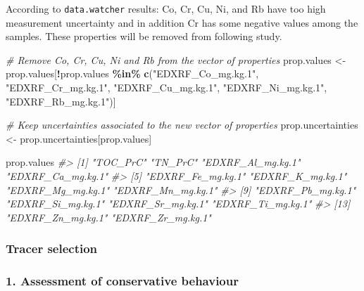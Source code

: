\documentclass[
]{article}
\newenvironment{Shaded}{\begin{snugshade}}{\end{snugshade}}
\newcommand{\CommentTok}[1]{\textcolor[rgb]{0.56,0.35,0.01}{\textit{#1}}}
\newcommand{\FunctionTok}[1]{\textcolor[rgb]{0.13,0.29,0.53}{\textbf{#1}}}
\newcommand{\NormalTok}[1]{#1}
\newcommand{\OtherTok}[1]{\textcolor[rgb]{0.56,0.35,0.01}{#1}}
\newcommand{\SpecialCharTok}[1]{\textcolor[rgb]{0.81,0.36,0.00}{\textbf{#1}}}
\newcommand{\StringTok}[1]{\textcolor[rgb]{0.31,0.60,0.02}{#1}}
\begin{document}
According to \texttt{data.watcher} results: Co, Cr, Cu, Ni, and Rb have
too high measurement uncertainty and in addition Cr has some negative
values among the samples. These properties will be removed from
following study.

\begin{Shaded}
\begin{Highlighting}[]
\CommentTok{\# Remove Co, Cr, Cu, Ni and Rb from the vector of properties}
\NormalTok{prop.values }\OtherTok{\textless{}{-}}\NormalTok{ prop.values[}\SpecialCharTok{!}\NormalTok{prop.values }\SpecialCharTok{\%in\%} \FunctionTok{c}\NormalTok{(}\StringTok{"EDXRF\_Co\_mg.kg.1"}\NormalTok{, }\StringTok{"EDXRF\_Cr\_mg.kg.1"}\NormalTok{, }\StringTok{"EDXRF\_Cu\_mg.kg.1"}\NormalTok{, }\StringTok{"EDXRF\_Ni\_mg.kg.1"}\NormalTok{, }\StringTok{"EDXRF\_Rb\_mg.kg.1"}\NormalTok{)]}

\CommentTok{\# Keep uncertainties associated to the new vector of properties}
\NormalTok{prop.uncertainties }\OtherTok{\textless{}{-}}\NormalTok{ prop.uncertainties[prop.values]}
\end{Highlighting}
\end{Shaded}

\begin{Shaded}
\begin{Highlighting}[]
\NormalTok{prop.values}
\CommentTok{\#\textgreater{}  [1] "TOC\_PrC"          "TN\_PrC"           "EDXRF\_Al\_mg.kg.1" "EDXRF\_Ca\_mg.kg.1"}
\CommentTok{\#\textgreater{}  [5] "EDXRF\_Fe\_mg.kg.1" "EDXRF\_K\_mg.kg.1"  "EDXRF\_Mg\_mg.kg.1" "EDXRF\_Mn\_mg.kg.1"}
\CommentTok{\#\textgreater{}  [9] "EDXRF\_Pb\_mg.kg.1" "EDXRF\_Si\_mg.kg.1" "EDXRF\_Sr\_mg.kg.1" "EDXRF\_Ti\_mg.kg.1"}
\CommentTok{\#\textgreater{} [13] "EDXRF\_Zn\_mg.kg.1" "EDXRF\_Zr\_mg.kg.1"}
\end{Highlighting}
\end{Shaded}

\hypertarget{tracer-selection}{%
\subsubsection{Tracer selection}\label{tracer-selection}}

\hypertarget{assessment-of-conservative-behaviour}{%
\subsubsection{1. Assessment of conservative
behaviour}\label{assessment-of-conservative-behaviour}}
\end{document}
